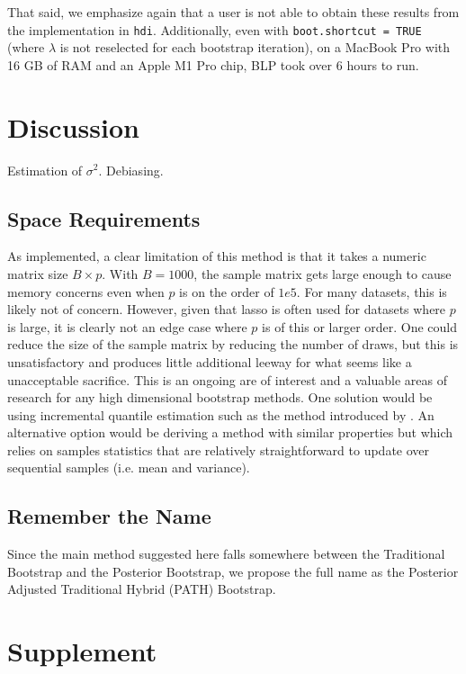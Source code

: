 That said, we emphasize again that a user is not able to obtain these results from the implementation in \texttt{hdi}. Additionally, even with \texttt{boot.shortcut = TRUE} (where $\lambda$ is not reselected for each bootstrap iteration), on a MacBook Pro with 16 GB of RAM and an Apple M1 Pro chip, BLP took over 6 hours to run. 

\section{Discussion}

Estimation of $\sigma^2$. Debiasing.

\subsection{Space Requirements}

As implemented, a clear limitation of this method is that it takes a numeric matrix size $B \times p$. With $B = 1000$, the sample matrix gets large enough to cause memory concerns even when $p$ is on the order of $1e5$. For many datasets, this is likely not of concern. However, given that lasso is often used for datasets where $p$ is large, it is clearly not an edge case where $p$ is of this or larger order. One could reduce the size of the sample matrix by reducing the number of draws, but this is unsatisfactory and produces little additional leeway for what seems like a unacceptable sacrifice. This is an ongoing are of interest and a valuable areas of research for any high dimensional bootstrap methods. One solution would be using incremental quantile estimation such as the method introduced by \cite{Tierney1983}. An alternative option would be deriving a method with similar properties but which relies on samples statistics that are relatively straightforward to update over sequential samples (i.e. mean and variance).

\subsection{Remember the Name}

Since the main method suggested here falls somewhere between the Traditional Bootstrap and the Posterior Bootstrap, we propose the full name as the Posterior Adjusted Traditional Hybrid (PATH) Bootstrap.

\newpage

\section*{Supplement}


